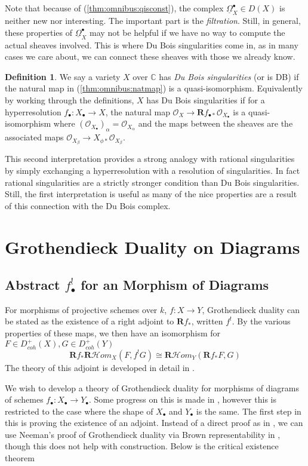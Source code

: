 \documentclass{report}
\theoremstyle{definition}
\newtheorem{definition}[theorem]{Definition}
\newcommand{\cHom}{\mathcal{H} \textit{om}}
\newcommand{\CC}{\mathbb{C}}
\newcommand{\OO}{\mathcal{O}}
\newcommand{\bR}{\textbf{R}}
\newcommand{\DB}{\underline{\Omega}}
\begin{document}
Note that because of (\ref{thm:omnibus:qisconst}), the complex $\DB_X^\bullet \in D(X)$ is neither new nor interesting.
The important part is the {\it filtration}.
Still, in general, these properties of $\DB_X^\bullet$ may not be helpful if we have no way to compute the actual sheaves involved.
This is where Du Bois singularities come in, as in many cases we care about, we can connect these sheaves with those we already know.

\begin{definition}
	\label{def:dubois}
	We say a variety $X$ over $\CC$ has {\it Du Bois singularities} (or is DB) if the natural map in (\ref{thm:omnibus:natmap}) is a quasi-isomorphism.
	Equivalently by working through the definitions, $X$  has Du Bois singularities if for a hyperresolution $f_{\bullet} : X_\bullet \rightarrow X$, the natural map $\OO_X \rightarrow\bR f_{\bullet *} \OO_{X_\bullet}$ is a quasi-isomorphism where $(\OO_{X_\bullet})_\alpha = \OO_{X_\alpha}$ and the maps between the sheaves are the associated maps $\OO_{X_\beta} \rightarrow X_{\phi *} \OO_{X_\beta}$.
\end{definition}

This second interpretation provides a strong analogy with rational singularities by simply exchanging a hyperresolution with a resolution of singularities.
In fact rational singularities are a strictly stronger condition than Du Bois singularities.
Still, the first interpretation is useful as many of the nice properties are a result of this connection with the Du Bois complex.

\chapter{Grothendieck Duality on Diagrams}

\section{Abstract $f_\bullet^!$ for an Morphism of Diagrams}
For morphisms of projective schemes over $k$, $f : X \rightarrow Y$, Grothendieck duality can be stated as the existence of a right adjoint to $\bR f_*$, written $f^!$.
By the various properties of these maps, we then have an isomorphism for $F \in D_{coh}^+(X), G \in D_{coh}^+(Y)$
\[
\bR f_* \bR \cHom_X(F, f^! G) \cong \bR \cHom_Y(\bR f_* F, G)
\]
The theory of this adjoint is developed in detail in \cite{Hartshorne1966}.

We wish to develop a theory of Grothendieck duality for morphisms of diagrams of schemes $f_\bullet : X_\bullet \rightarrow Y_\bullet$.
Some progress on this is made in \cite{Lipman2009}, however this is restricted to the case where the shape of $X_\bullet$ and $Y_\bullet$ is the same.
The first step in this is proving the existence of an adjoint.
Instead of a direct proof as in \cite{Hartshorne1966}, we can use Neeman's proof of Grothendieck duality via Brown representability in \cite{Neeman1996}, though this does not help with construction.
Below is the critical existence theorem
\end{document}
